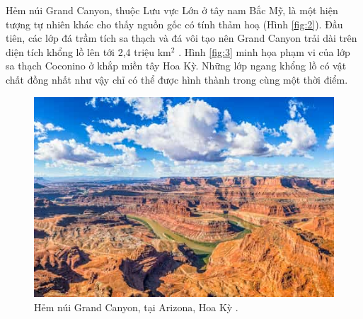 \documentclass[10pt,twocolumn,letterpaper]{article}
\begin{document}
Hẻm núi Grand Canyon, thuộc Lưu vực Lớn ở tây nam Bắc Mỹ, là một hiện tượng tự nhiên khác cho thấy nguồn gốc có tính thảm hoạ (Hình \ref{fig:2}). Đầu tiên, các lớp đá trầm tích sa thạch và đá vôi tạo nên Grand Canyon trải dài trên diện tích khổng lồ lên tới 2,4 triệu km$^2$ \cite{21}. Hình \ref{fig:3} minh họa phạm vi của lớp sa thạch Coconino ở khắp miền tây Hoa Kỳ. Những lớp ngang khổng lồ có vật chất đồng nhất như vậy chỉ có thể được hình thành trong cùng một thời điểm.

\begin{figure}[t]
\begin{center}
   \includegraphics[width=1\linewidth]{grand-canyon.jpg}
\end{center}
   \caption{Hẻm núi Grand Canyon, tại Arizona, Hoa Kỳ \cite{49}.}
\label{fig:2}
\label{fig:onecol}
\end{figure}
\end{document}
